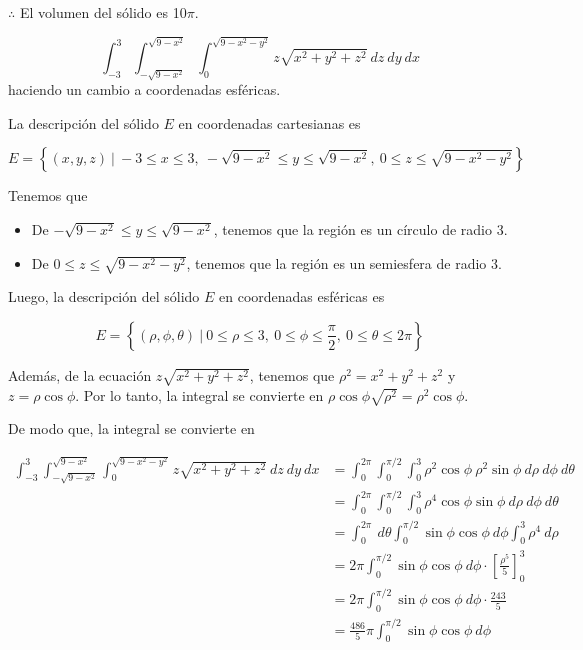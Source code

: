 \documentclass[12pt]{exam}
\begin{document}
\begin{questions}
  $\therefore$ El volumen del sólido es 10$\pi$.

  \[
  \int_{-3}^{3}\int_{-\sqrt{9-x^2}}^{\sqrt{9-x^2}}\int_{0}^{\sqrt{9-x^2-y^2}}z\sqrt{x^2+y^2+z^2}~dz~dy~dx
  \]
  haciendo un cambio a coordenadas esféricas.

  La descripción del sólido $E$ en coordenadas cartesianas es

  \[
  E = \left\{(x, y, z)~|~-3 \leq x \leq 3,~-\sqrt{9-x^2} \leq y \leq \sqrt{9-x^2},~0 \leq z \leq \sqrt{9-x^2-y^2}\right\}
  \]

  Tenemos que 
  \begin{itemize}
    \item De $-\sqrt{9-x^2} \leq y \leq \sqrt{9-x^2}$, tenemos que la región es un círculo de radio 3.
    \item De $0 \leq z \leq \sqrt{9-x^2-y^2}$, tenemos que la región es un semiesfera de radio 3.
  \end{itemize}

  Luego, la descripción del sólido $E$ en coordenadas esféricas es

  \[
  E = \left\{(\rho, \phi, \theta)~|~0 \leq \rho \leq 3,~0 \leq \phi \leq \frac{\pi}{2},~0 \leq \theta \leq 2\pi\right\}
  \]

  Además, de la ecuación $z\sqrt{x^2+y^2+z^2}$, tenemos que $\rho^2= x^2+y^2+z^2$ y $z = \rho\cos{\phi}$. Por lo tanto, la integral se convierte en $\rho\cos{\phi}\sqrt{\rho^2} = \rho^2\cos{\phi}$.

  De modo que, la integral se convierte en

  \begin{align*}
    \int_{-3}^{3}\int_{-\sqrt{9-x^2}}^{\sqrt{9-x^2}}\int_{0}^{\sqrt{9-x^2-y^2}}z\sqrt{x^2+y^2+z^2}~dz~dy~dx
    &= \int_{0}^{2\pi}\int_{0}^{\pi/2}\int_{0}^{3}\rho^2\cos{\phi}~ \rho^2\sin{\phi}~d\rho~d\phi~d\theta\\
    &= \int_{0}^{2\pi}\int_{0}^{\pi/2}\int_{0}^{3} \rho^4\cos{\phi}\sin{\phi}~d\rho~d\phi~d\theta\\
    &= \int_{0}^{2\pi}~d\theta \int_{0}^{\pi/2}\sin{\phi}\cos{\phi}~d\phi \int_{0}^{3}\rho^4~d\rho\\
    &= 2\pi \int_{0}^{\pi/2}\sin{\phi}\cos{\phi}~d\phi \cdot \left[\frac{\rho^5}{5}\right]_{0}^{3}\\
    &= 2\pi \int_{0}^{\pi/2}\sin{\phi}\cos{\phi}~d\phi \cdot \frac{243}{5}\\
    &= \frac{486}{5} \pi \int_{0}^{\pi/2}\sin{\phi}\cos{\phi}~d\phi
    \end{align*}


\end{questions}
\end{document}
